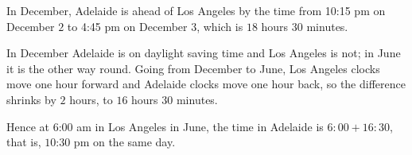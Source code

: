 In December, Adelaide is ahead of Los Angeles by the time from 10:15 pm on December $2$ to 4:45 pm on December $3$, which is $18$ hours $30$ minutes.

In December Adelaide is on daylight saving time and Los Angeles is not; in June it is the other way round. Going from December to June, Los Angeles clocks move one hour forward and Adelaide clocks move one hour back, so the difference shrinks by $2$ hours, to $16$ hours $30$ minutes.

Hence at 6:00 am in Los Angeles in June, the time in Adelaide is $6{:}00+16{:}30$, that is, $\boxed{\text{10:30 pm}}$ on the same day.

